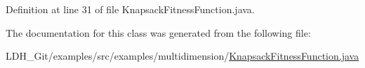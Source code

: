 Definition at line 31 of file Knapsack\-Fitness\-Function.\-java.



The documentation for this class was generated from the following file\-:\begin{DoxyCompactItemize}
\item 
L\-D\-H\-\_\-\-Git/examples/src/examples/multidimension/\hyperlink{multidimension_2_knapsack_fitness_function_8java}{Knapsack\-Fitness\-Function.\-java}\end{DoxyCompactItemize}
